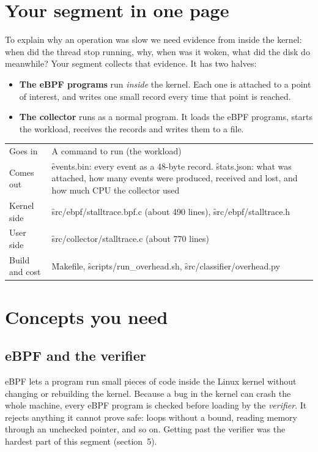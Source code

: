 \documentclass[11pt]{article}
\begin{document}

\section{Your segment in one page}


To explain why an operation was slow we need evidence from inside the kernel: when did the thread stop running, why, when was it woken, what did the disk do meanwhile? Your segment collects that evidence. It has two halves:

\begin{itemize}
\item \textbf{The eBPF programs} run \emph{inside} the kernel. Each one is attached to a point of interest, and writes one small record every time that point is reached.
\item \textbf{The collector} runs as a normal program. It loads the eBPF programs, starts the workload, receives the records and writes them to a file.
\end{itemize}

\begin{center}
\begin{tabularx}{\textwidth}{@{}lY@{}}
\toprule
Goes in & A command to run (the workload) \\
Comes out & \f{events.bin}: every event as a 48-byte record. \f{stats.json}: what was attached, how many events were produced, received and lost, and how much CPU the collector used \\
Kernel side & \f{src/ebpf/stalltrace.bpf.c} (about 490 lines), \f{src/ebpf/stalltrace.h} \\
User side & \f{src/collector/stalltrace.c} (about 770 lines) \\
Build and cost & \f{Makefile}, \f{scripts/run\_overhead.sh}, \f{src/classifier/overhead.py} \\
\bottomrule
\end{tabularx}
\end{center}

\section{Concepts you need}

\subsection{eBPF and the verifier}
eBPF lets a program run small pieces of code inside the Linux kernel without changing or rebuilding the kernel. Because a bug in the kernel can crash the whole machine, every eBPF program is checked before loading by the \emph{verifier}. It rejects anything it cannot prove safe: loops without a bound, reading memory through an unchecked pointer, and so on. Getting past the verifier was the hardest part of this segment (section~5).
\end{document}
